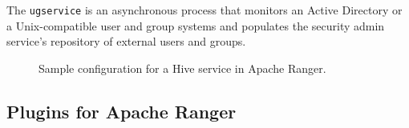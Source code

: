 The \texttt{ugservice} is an asynchronous process that monitors an Active Directory or a Unix-compatible user and group systems and populates the security admin service's repository of external users and groups.

\begin{figure}
    \centering
    \qquad
    \caption{Sample configuration for a Hive service in Apache Ranger.}
    \label{fig:ranger_hive_details}
\end{figure}

\subsection{\label{sec:plugins_for_apache_ranger} Plugins for Apache Ranger}


